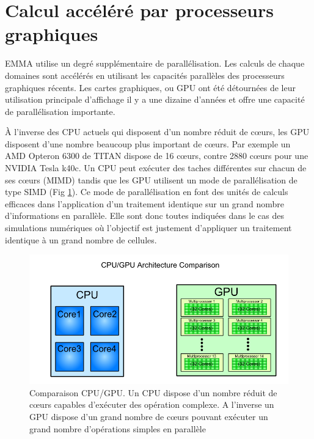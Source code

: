 \section{Calcul accéléré par processeurs graphiques}
\label{sec:gpu}

EMMA utilise un degré supplémentaire de parallélisation.
Les calculs de chaque domaines sont accélérés en utilisant les capacités parallèles des processeurs graphiques récents.
Les cartes graphiques, ou \ac{GPU} ont été détournées de leur utilisation principale d'affichage il y a une dizaine d'années et offre une capacité de parallélisation importante. 

À l'inverse des \ac{CPU} actuels qui disposent d'un nombre réduit de cœurs, les \ac{GPU} disposent d'une nombre beaucoup plus important de cœurs.
Par exemple un AMD Opteron 6300 de TITAN dispose de 16 cœurs, contre 2880 cœurs pour une NVIDIA Tesla k40c.
Un \ac{CPU} peut exécuter des taches différentes sur chacun de ses cœurs (MIMD) tandis que les \ac{GPU} utilisent un mode de parallélisation de type SIMD (Fig \ref{fig:cpugpu}).
Ce mode de parallélisation en font des unités de calculs efficaces dans l'application d'un traitement identique sur un grand nombre d'informations en parallèle.
Elle sont donc toutes indiquées dans le cas des simulations numériques où l'objectif est justement d'appliquer un traitement identique à un grand nombre de cellules.

\begin{figure}
        \includegraphics[width=.95\linewidth]{img/02/cpu_vs_gpu.png} 
        \caption[Comparaison CPU/GPU]{Comparaison CPU/GPU. Un \ac{CPU} dispose d'un nombre réduit de cœurs capables d’exécuter des opération complexe. 
        A l'inverse un \ac{GPU} dispose d'un grand nombre de cœurs pouvant exécuter un grand nombre d'opérations simples en parallèle}
 		\label{fig:cpugpu}
\end{figure} 

